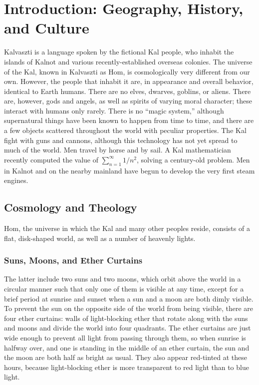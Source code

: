 \documentclass{report}
\title{\thetitle}
\author{\theauthor}
\begin{document}
\maketitle

\chapter{Introduction: Geography, History, and Culture}

Kalvaszti is a language spoken by the fictional Kal people, who inhabit the islands of Kalnot and various recently-established overseas colonies. The universe of the Kal, known in Kalvaszti as Hom, is cosmologically very different from our own. However, the people that inhabit it are, in appearance and overall behavior, identical to Earth humans. There are no elves, dwarves, goblins, or aliens. There are, however, gods and angels, as well as spirits of varying moral character; these interact with humans only rarely. There is no ``magic system,'' although supernatural things have been known to happen from time to time, and there are a few objects scattered throughout the world with peculiar properties. The Kal fight with guns and cannons, although this technology has not yet spread to much of the world. Men travel by horse and by sail. A Kal mathematician recently computed the value of $\sum_{n = 1}^\infty 1/n^2$, solving a century-old problem. Men in Kalnot and on the nearby mainland have begun to develop the very first steam engines.  

\section{Cosmology and Theology}

Hom, the universe in which the Kal and many other peoples reside, consists of a flat, disk-shaped world, as well as a number of heavenly lights. 

\subsection{Suns, Moons, and Ether Curtains}

The latter include two suns and two moons, which orbit above the world in a circular manner such that only one of them is visible at any time, except for a brief period at sunrise and sunset when a sun and a moon are both dimly visible. To prevent the sun on the opposite side of the world from being visible, there are four ether curtains: walls of light-blocking ether that rotate along with the suns and moons and divide the world into four quadrants. The ether curtains are just wide enough to prevent all light from passing through them, so when sunrise is halfway over, and one is standing in the middle of an ether curtain, the sun and the moon are both half as bright as usual. They also appear red-tinted at these hours, because light-blocking ether is more transparent to red light than to blue light. 
\end{document}
